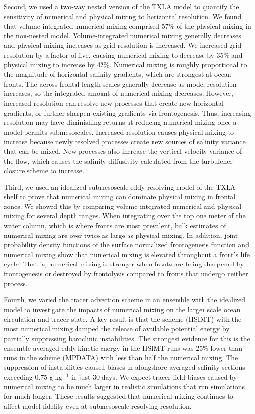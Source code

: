 Second, we used a two-way nested version of the TXLA model to quantify the sensitivity of numerical and physical mixing to horizontal resolution. We found that volume-integrated numerical mixing comprised 57\% of the physical mixing in the non-nested model. Volume-integrated numerical mixing generally decreases and physical mixing increases as grid resolution is increased. We increased grid resolution by a factor of five, causing numerical mixing to decrease by 35\% and physical mixing to increase by 42\%. Numerical mixing is roughly proportional to the magnitude of horizontal salinity gradients, which are strongest at ocean fronts. The across-frontal length scales generally decrease as model resolution increases, so the integrated amount of numerical mixing decreases. However, increased resolution can resolve new processes that create new horizontal gradients, or further sharpen existing gradients via frontogenesis. Thus, increasing resolution may have diminishing returns at reducing numerical mixing once a model permits submesoscales. Increased resolution causes physical mixing to increase because newly resolved processes create new sources of salinity variance that can be mixed. New processes also increase the vertical velocity variance of the flow, which causes the salinity diffusivity calculated from the turbulence closure scheme to increase. 

Third, we used an idealized submesoscale eddy-resolving model of the TXLA shelf to prove that numerical mixing can dominate physical mixing in frontal zones. We showed this by comparing volume-integrated numerical and physical mixing for several depth ranges. When integrating over the top one meter of the water column, which is where fronts are most prevalent, bulk estimates of numerical mixing are over twice as large as physical mixing. In addition, joint probability density functions of the surface normalized frontogenesis function and numerical mixing show that numerical mixing is elevated throughout a front's life cycle. That is, numerical mixing is stronger when fronts are being sharpened by frontogenesis or destroyed by frontolysis compared to fronts that undergo neither process. 

Fourth, we varied the tracer advection scheme in an ensemble with the idealized model to investigate the impacts of numerical mixing on the larger scale ocean circulation and tracer state. A key result is that the scheme (HSIMT) with the most numerical mixing damped the release of available potential energy by partially suppressing baroclinic instabilities. The strongest evidence for this is the ensemble-averaged eddy kinetic energy in the HSIMT runs was 25\% lower than runs in the scheme (MPDATA) with less than half the numerical mixing. The suppression of instabilities caused biases in alongshore-averaged salinity sections exceeding 0.75 g kg$^{-1}$ in just 30 days. We expect tracer field biases caused by numerical mixing to be much larger in realistic simulations that run simulations for much longer. These results suggested that numerical mixing continues to affect model fidelity even at submesoscale-resolving resolution. 

